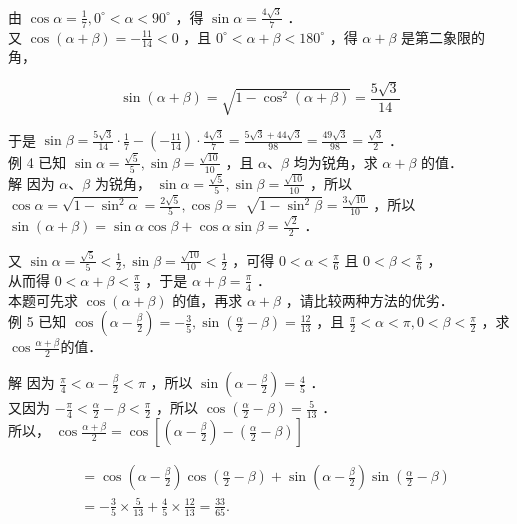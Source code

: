 \documentclass[10pt]{article}
\begin{document}
由 \(\cos \alpha=\frac{1}{7}, 0^{\circ}<\alpha<90^{\circ}\) ，得 \(\sin \alpha=\frac{4 \sqrt{3}}{7}\) ．\\
又 \(\cos (\alpha+\beta)=-\frac{11}{14}<0\) ，且 \(0^{\circ}<\alpha+\beta<180^{\circ}\) ，得 \(\alpha+\beta\) 是第二象限的角，

\[
\sin (\alpha+\beta)=\sqrt{1-\cos ^{2}(\alpha+\beta)}=\frac{5 \sqrt{3}}{14}
\]

于是 \(\sin \beta=\frac{5 \sqrt{3}}{14} \cdot \frac{1}{7}-\left(-\frac{11}{14}\right) \cdot \frac{4 \sqrt{3}}{7}=\frac{5 \sqrt{3}+44 \sqrt{3}}{98}=\frac{49 \sqrt{3}}{98}=\frac{\sqrt{3}}{2}\) ．\\
例 4 已知 \(\sin \alpha=\frac{\sqrt{5}}{5}, \sin \beta=\frac{\sqrt{10}}{10}\) ，且 \(\alpha 、 \beta\) 均为锐角，求 \(\alpha+\beta\) 的值．\\
解 因为 \(\alpha 、 \beta\) 为锐角， \(\sin \alpha=\frac{\sqrt{5}}{5}, \sin \beta=\frac{\sqrt{10}}{10}\) ，所以 \(\cos \alpha=\sqrt{1-\sin ^{2} \alpha}=\frac{2 \sqrt{5}}{5}, \cos \beta=\) \(\sqrt{1-\sin ^{2} \beta}=\frac{3 \sqrt{10}}{10}\) ，所以 \(\sin (\alpha+\beta)=\sin \alpha \cos \beta+\cos \alpha \sin \beta=\frac{\sqrt{2}}{2}\) ．

又 \(\sin \alpha=\frac{\sqrt{5}}{5}<\frac{1}{2}, \sin \beta=\frac{\sqrt{10}}{10}<\frac{1}{2}\) ，可得 \(0<\alpha<\frac{\pi}{6}\) 且 \(0<\beta<\frac{\pi}{6}\) ，\\
从而得 \(0<\alpha+\beta<\frac{\pi}{3}\) ，于是 \(\alpha+\beta=\frac{\pi}{4}\) ．\\
本题可先求 \(\cos (\alpha+\beta)\) 的值，再求 \(\alpha+\beta\) ，请比较两种方法的优劣．\\
例 5 已知 \(\cos \left(\alpha-\frac{\beta}{2}\right)=-\frac{3}{5}, \sin \left(\frac{\alpha}{2}-\beta\right)=\frac{12}{13}\) ，且 \(\frac{\pi}{2}<\alpha<\pi, 0<\beta<\frac{\pi}{2}\) ，求 \(\cos \frac{\alpha+\beta}{2}\)的值．

解 因为 \(\frac{\pi}{4}<\alpha-\frac{\beta}{2}<\pi\) ，所以 \(\sin \left(\alpha-\frac{\beta}{2}\right)=\frac{4}{5}\) ．\\
又因为 \(-\frac{\pi}{4}<\frac{\alpha}{2}-\beta<\frac{\pi}{2}\) ，所以 \(\cos \left(\frac{\alpha}{2}-\beta\right)=\frac{5}{13}\) ．\\
所以， \(\cos \frac{\alpha+\beta}{2}=\cos \left[\left(\alpha-\frac{\beta}{2}\right)-\left(\frac{\alpha}{2}-\beta\right)\right]\)

\[
\begin{aligned}
& =\cos \left(\alpha-\frac{\beta}{2}\right) \cos \left(\frac{\alpha}{2}-\beta\right)+\sin \left(\alpha-\frac{\beta}{2}\right) \sin \left(\frac{\alpha}{2}-\beta\right) \\
& =-\frac{3}{5} \times \frac{5}{13}+\frac{4}{5} \times \frac{12}{13}=\frac{33}{65} .
\end{aligned}
\]
\end{document}
